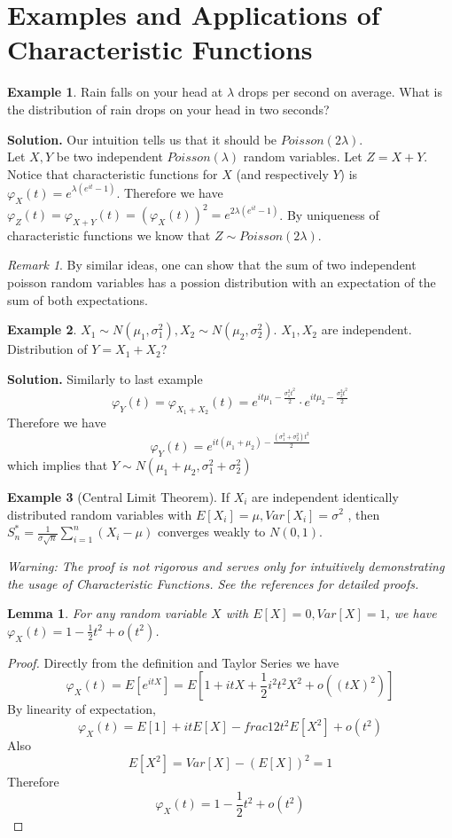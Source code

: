 \documentclass{article}
\theoremstyle{definition}
\newtheorem{example}{Example}[section]
\theoremstyle{plain}
\newtheorem{lemma}{Lemma}[section]
\theoremstyle{remark}
\newtheorem*{remark}{Remark}
\begin{document}
\section{Examples and Applications of Characteristic Functions}
\begin{example}
	Rain falls on your head at $\lambda$ drops per second on average. What is the distribution of rain drops on your head in two seconds?
\end{example}
\noindent\textbf{Solution.}
Our intuition tells us that it should be $Poisson(2\lambda)$. \\
Let $X,Y$ be two independent $Poisson(\lambda)$ random variables. Let $Z=X+Y$.
Notice that characteristic functions for $X$ (and respectively $Y$) is $\varphi_X(t)=e^{\lambda(e^{it}-1)}$.
Therefore we have $\varphi_Z(t)=\varphi_{X+Y}(t)=(\varphi_X(t))^2=e^{2\lambda(e^{it}-1)}$. 
By uniqueness of characteristic functions we know that $Z\sim Poisson(2\lambda)$.
\begin{remark}
	By similar ideas, one can show that the sum of two independent poisson random variables has a possion distribution with an expectation of the sum of both expectations.
\end{remark}
\begin{example}
	$X_1\sim N(\mu_1,\sigma_1^2), X_2\sim N(\mu_2,\sigma_2^2).$ $X_1,X_2$ are independent. Distribution of $Y=X_1+X_2$?
\end{example}
\noindent\textbf{Solution.}
Similarly to last example $$\varphi_{Y}(t)=\varphi_{X_1+X_2}(t)=e^{it\mu_1-\frac{\sigma_1^2 t^2}{2}}\cdot e^{it\mu_2-\frac{\sigma_2^2 t^2}{2}}$$
Therefore we have $$\varphi_Y(t)=e^{it(\mu_1+\mu_2)-\frac{(\sigma_1^2+\sigma_2^2)t^2}{2}}$$
which implies that $Y\sim N(\mu_1+\mu_2,\sigma_1^2+\sigma_2^2)$
\begin{example}[Central Limit Theorem\cite{waterloo}]
	If $X_i$ are independent identically distributed random variables with $E[X_i] = \mu, Var[X_i] = \sigma^2$ , then $S_n^* = \frac1{\sigma\sqrt n}\sum_{i=1}^n(X_i-\mu)$ converges weakly to $N(0, 1)$.
\end{example}
\noindent\textit{Warning: The proof is not rigorous and serves only for intuitively demonstrating the usage of Characteristic Functions. See the references\cite{waterloo,nus} for detailed proofs.}
\begin{lemma}
	For any random variable $X$ with $E[X]=0,Var[X]=1$, we have $\varphi_X(t)=1-\frac12t^2+o(t^2)$.
	\label{lem:clt}
\end{lemma}
\begin{proof}
	Directly from the definition and Taylor Series we have
	$$\varphi_X(t)=E[e^{itX}]=E[1+itX+\frac12i^2t^2X^2+o((tX)^2)]$$
	By linearity of expectation,
	$$\varphi_X(t)=E[1]+itE[X]-frac12t^2E[X^2]+o(t^2)$$
	Also
	$$E[X^2]=Var[X]-(E[X])^2=1$$
	Therefore $$\varphi_X(t)=1-\frac12t^2+o(t^2)$$
\end{proof}
\end{document}
